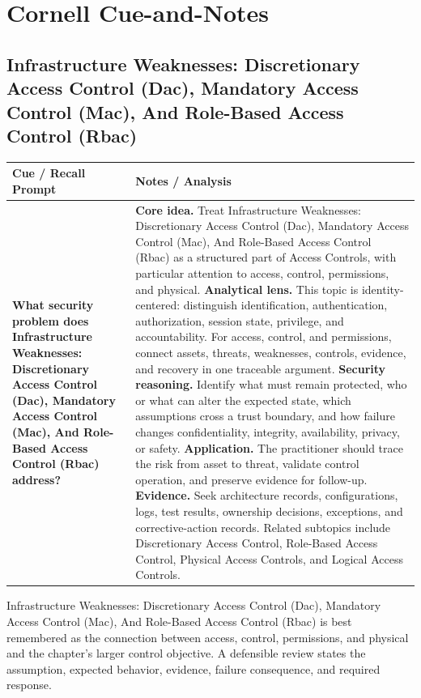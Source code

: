 \documentclass[11pt]{article}
\newcommand{\CornellHeader}{%
\rowcolor{Navy}\color{white}\bfseries Cue / Recall Prompt & \color{white}\bfseries Notes / Analysis\\\hline}
\newcommand{\CornellRow}[2]{%
\cellcolor{CueGray}\RaggedRight\textbf{#1} & \RaggedRight #2\\\hline}
\begin{document}
\section*{Cornell Cue-and-Notes}
\subsection*{Infrastructure Weaknesses: Discretionary Access Control (Dac), Mandatory Access Control (Mac), And Role-Based Access Control (Rbac)}
\begin{longtable}{>{\RaggedRight\arraybackslash}p{}|>{\RaggedRight\arraybackslash}p{}}
\CornellHeader
\CornellRow{What security problem does Infrastructure Weaknesses: Discretionary Access Control (Dac), Mandatory Access Control (Mac), And Role-Based Access Control (Rbac) address?}{\textbf{Core idea.} Treat Infrastructure Weaknesses: Discretionary Access Control (Dac), Mandatory Access Control (Mac), And Role-Based Access Control (Rbac) as a structured part of Access Controls, with particular attention to access, control, permissions, and physical. \textbf{Analytical lens.} This topic is identity-centered: distinguish identification, authentication, authorization, session state, privilege, and accountability. For access, control, and permissions, connect assets, threats, weaknesses, controls, evidence, and recovery in one traceable argument. \textbf{Security reasoning.} Identify what must remain protected, who or what can alter the expected state, which assumptions cross a trust boundary, and how failure changes confidentiality, integrity, availability, privacy, or safety. \textbf{Application.} The practitioner should trace the risk from asset to threat, validate control operation, and preserve evidence for follow-up. \textbf{Evidence.} Seek architecture records, configurations, logs, test results, ownership decisions, exceptions, and corrective-action records. Related subtopics include Discretionary Access Control, Role-Based Access Control, Physical Access Controls, and Logical Access Controls.}
\end{longtable}
\begin{topicsummary}
Infrastructure Weaknesses: Discretionary Access Control (Dac), Mandatory Access Control (Mac), And Role-Based Access Control (Rbac) is best remembered as the connection between access, control, permissions, and physical and the chapter's larger control objective. A defensible review states the assumption, expected behavior, evidence, failure consequence, and required response.
\end{topicsummary}
\end{document}
